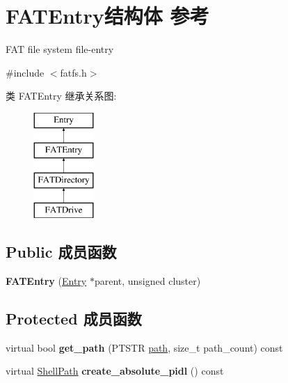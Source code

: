 \hypertarget{struct_f_a_t_entry}{}\section{F\+A\+T\+Entry结构体 参考}
\label{struct_f_a_t_entry}


F\+AT file system file-\/entry  




{\ttfamily \#include $<$fatfs.\+h$>$}

类 F\+A\+T\+Entry 继承关系图\+:\begin{figure}[H]
\begin{center}
\leavevmode
\includegraphics[height=4.000000cm]{struct_f_a_t_entry}
\end{center}
\end{figure}
\subsection*{Public 成员函数}
\begin{DoxyCompactItemize}
\item 
\mbox{\label{struct_f_a_t_entry_a125accecd018a1c37f51335706e1004d}} 
{\bfseries F\+A\+T\+Entry} (\hyperlink{struct_entry}{Entry} $\ast$parent, unsigned cluster)
\end{DoxyCompactItemize}
\subsection*{Protected 成员函数}
\begin{DoxyCompactItemize}
\item 
\mbox{\label{struct_f_a_t_entry_a35de3cd37e350b446c258c68baa0dedb}} 
virtual bool {\bfseries get\+\_\+path} (P\+T\+S\+TR \hyperlink{structpath}{path}, size\+\_\+t path\+\_\+count) const
\item 
\mbox{\label{struct_f_a_t_entry_ac1f6c84b8b427ef452615c965aed2811}} 
virtual \hyperlink{struct_shell_path}{Shell\+Path} {\bfseries create\+\_\+absolute\+\_\+pidl} () const
\end{DoxyCompactItemize}
